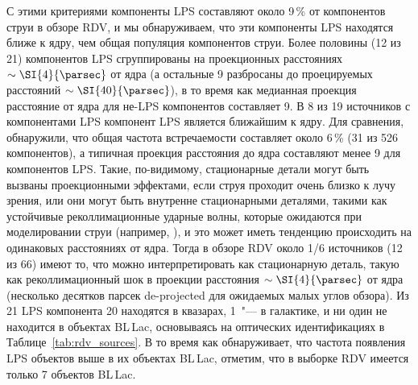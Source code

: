 С этими критериями компоненты LPS составляют около 9\,\% от компонентов струи в обзоре RDV, и мы
обнаруживаем, что эти компоненты LPS находятся ближе к ядру, чем общая популяция компонентов струи.
Более половины (12 из 21) компонентов LPS сгруппированы на проекционных расстояниях
$\sim\SI{4}{\parsec}$ от ядра (а остальные 9 разбросаны до проецируемых расстояний
$\sim\SI{40}{\parsec}$), в то время как медианная проекция расстояние от ядра для не-LPS
компонентов  составляет \SI{9}{\parsec}. В 8 из 19 источников с компонентами LPS компонент LPS
является ближайшим к ядру. Для сравнения, \cite{Lister_2009b} обнаружили, что общая частота
встречаемости составляет около 6\,\% (31 из 526 компонентов), а типичная проекция расстояния
до ядра составляют менее \SI{9}{\parsec} для компонентов LPS. Такие, по-видимому, стационарные
детали могут быть вызваны проекционными эффектами, если струя проходит очень близко к лучу зрения,
или они могут быть внутренне стационарными деталями, такими как устойчивые реколлимационные
ударные волны, которые ожидаются при моделировании струи (например, \cite{Gomez_1995}), и это может
иметь тенденцию происходить на одинаковых расстояниях от ядра. Тогда в обзоре RDV около 1/6
источников (12 из 66) имеют то, что можно интерпретировать как стационарную деталь, такую как
реколлимационный шок в проекции расстояния $\sim\SI{4}{\parsec}$ от ядра (несколько десятков
парсек de-projected для ожидаемых малых углов обзора). Из 21 LPS компонента 20 находятся в
квазарах, 1~"--- в галактике, и ни один не находится в объектах BL\,Lac, основываясь на оптических
идентификациях в Таблице~\ref{tab:rdv_sources}. В то время как \cite{Lister_2009b} обнаруживает, что
частота появления LPS объектов выше в их объектах BL\,Lac, отметим, что в выборке RDV имеется
только 7 объектов BL\,Lac.

